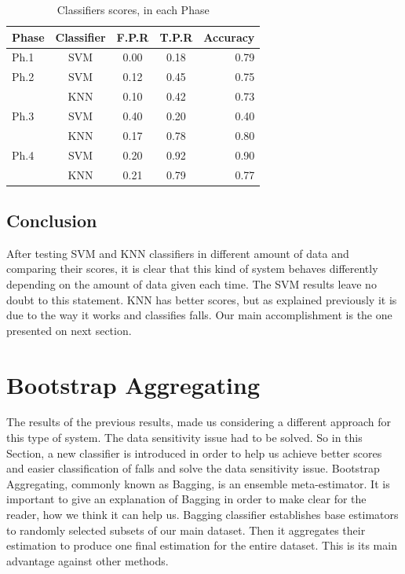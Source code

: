 \documentclass{article}
\begin{document}
\begin{table}[t]
\caption{Classifiers scores, in each Phase}
\label{Scores}
\vskip 0.1in
\begin{center}
\begin{small}
\begin{sc}
\begin{tabular}{lcccr}
\hline
\abovespace
Phase & Classifier & F.P.R & T.P.R & Accuracy\\
\hline
\abovespace
Ph.1    & SVM & 0.00 & 0.18 & 0.79 \\
\hline
\abovespace
Ph.2    & SVM & 0.12 & 0.45 & 0.75 \\
     & KNN & 0.10 & 0.42 & 0.73 \\
\hline
\abovespace
Ph.3    & SVM & 0.40 & 0.20 & 0.40 \\
	 & KNN & 0.17 & 0.78 & 0.80 \\
\hline
\abovespace
Ph.4    & SVM & 0.20 & 0.92 & 0.90 \\
	 & KNN & 0.21 & 0.79 & 0.77 \\
\hline
\end{tabular}
\end{sc}
\end{small}
\end{center}
\vskip -0.3in
\end{table}

\subsection{Conclusion}

After testing SVM and KNN classifiers in different amount of data and comparing their scores, it is clear that this kind of system behaves differently depending on the amount of data given each time. The SVM results leave no doubt to this statement. KNN has better scores, but as explained previously it is due to the way it works and classifies falls. Our main accomplishment is the one presented on next section.
 
\section{Bootstrap Aggregating}

The results of the previous results, made us considering a different approach for this type of system. The data sensitivity issue had to be solved. So in this Section, a new classifier is introduced in order to help us achieve better scores and easier classification of falls and solve the data sensitivity issue. Bootstrap Aggregating, commonly known as Bagging, is an ensemble meta-estimator. It is important to give an explanation of Bagging in order to make clear for the reader, how we think it can help us. Bagging classifier establishes base estimators to randomly selected subsets of our main dataset. Then it aggregates their estimation to produce one final estimation for the entire dataset. This is its main advantage against other methods. 
\end{document}

